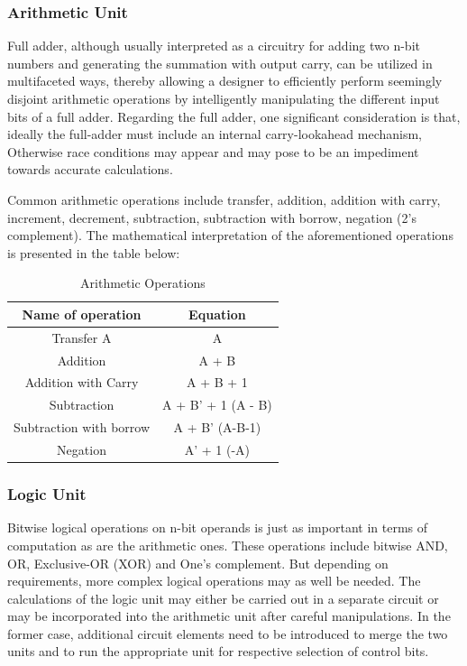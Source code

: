 \documentclass{article}
\begin{document}
\subsubsection{Arithmetic Unit}

Full adder, although usually interpreted as a circuitry for adding two n-bit numbers and generating the summation with output carry, can be utilized in multifaceted ways, thereby allowing a designer to efficiently perform seemingly disjoint arithmetic operations by intelligently manipulating the different input bits of a full adder. Regarding the full adder, one significant consideration is that, ideally the full-adder must include an internal carry-lookahead mechanism, Otherwise race conditions may appear and may pose to be an impediment towards accurate calculations.

Common arithmetic operations include transfer, addition, addition with carry, increment, decrement, subtraction, subtraction with borrow, negation (2’s complement). The mathematical interpretation of the aforementioned operations is presented in the table below:

\begin{center}
\begin{table}[h]
    \centering
\begin{tabular}{|c|c|}

\hline
\textbf{Name of operation} & \textbf{Equation}        \\ \hline
Transfer A              & A                  \\ \hline
Addition                & A + B              \\ \hline
Addition with Carry     & A + B + 1          \\ \hline
Subtraction             & A + B' + 1 (A - B) \\ \hline
Subtraction with borrow & A + B'  (A-B-1)    \\ \hline
Negation                & A' + 1 (-A)        \\ \hline

\end{tabular}
\caption{Arithmetic Operations}
\end{table}
\end{center}

\newpage
\subsubsection{Logic Unit}

Bitwise logical operations on n-bit operands is just as important in terms of computation as are the arithmetic ones. 
These operations include bitwise AND, OR, Exclusive-OR (XOR) and One's complement. But depending on requirements, more complex logical operations may as well be needed. The calculations of the logic unit may either be carried out in a separate circuit or may be incorporated into the arithmetic unit after careful manipulations. In the former case, additional circuit elements need to be introduced to merge the two units and to run the appropriate unit for respective selection of control bits.
\end{document}
